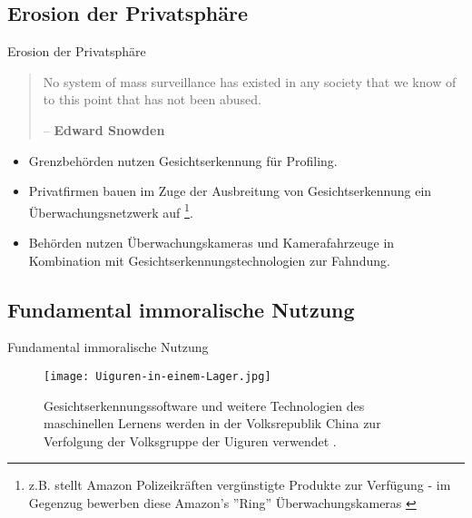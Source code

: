 \documentclass[10pt]{beamer}
\begin{document}
\subsection{Erosion der Privatsphäre}
\begin{frame}{Erosion der Privatsphäre}
  \begin{quote}
    No system of mass surveillance has existed in any society that we know of to this point that has not been abused. \\ \begin{center}
      -- \textbf{Edward Snowden} \cite{SnowdenInterview}
    \end{center}
  \end{quote}

  \begin{itemize}
    \item Grenzbehörden nutzen Gesichtserkennung für Profiling. \cite{NatureHalt}
          \pause \item Privatfirmen bauen  im Zuge der Ausbreitung von Gesichtserkennung ein Überwachungsnetzwerk auf \footnote{z.B. stellt Amazon Polizeikräften vergünstigte Produkte zur Verfügung - im Gegenzug bewerben diese Amazon's ''Ring'' Überwachungskameras \cite{NatureHalt}}.
          \pause \item Behörden nutzen Überwachungskameras und Kamerafahrzeuge in Kombination mit Gesichtserkennungstechnologien zur Fahndung. \cite{HelloWorld}
  \end{itemize}
\end{frame}


\subsection{Fundamental immoralische Nutzung}
\begin{frame}{Fundamental immoralische Nutzung}
  \begin{figure}
    \texttt{[image: Uiguren-in-einem-Lager.jpg]}
    \caption{Gesichtserkennungssoftware und weitere Technologien des maschinellen Lernens werden in der Volksrepublik China zur Verfolgung der Volksgruppe der Uiguren verwendet \cite{NatureEthicalQuestions}.
      }
  \end{figure}
\end{frame}
\end{document}
